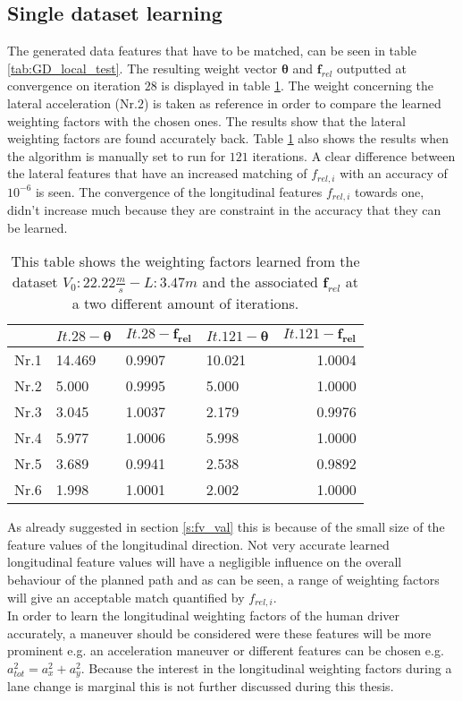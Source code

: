 \subsection{Single dataset learning}\label{s:SDL}
The generated data features that have to be matched, can be seen in table \ref{tab:GD_local_test}.
The resulting weight vector $\bm{\theta}$ and $\bm{f}_{rel}$ outputted at convergence on iteration $28$ is displayed in table \ref{tab:comp_it}. The weight concerning the lateral acceleration (Nr.$2$) is taken as reference in order to compare the learned weighting factors with the chosen ones. The results show that the lateral weighting factors are found accurately back. Table \ref{tab:comp_it} also shows the results when the algorithm is manually set to run for $121$ iterations.
A clear difference between the lateral features that have an increased matching of $f_{rel,i}$ with an accuracy of $10^{-6}$ is seen. The convergence of the longitudinal features $f_{rel,i}$ towards one, didn't increase much because they are constraint in the accuracy that they can be learned. 

\begin{table}[h!]
	\centering
	\begin{tabular}{@{}llllr@{}} \toprule
					      & $It.28-\bm{\theta}$ & $It.28-\bm{f_{rel}}$ & $It.121- \bm{\theta}$ & $It.121-\bm{f_{rel}}$\\ \midrule
		Nr.1       		  &14.469        & 0.9907 	    & 10.021 &	1.0004	\\
		Nr.2              &5.000       & 0.9995       & 5.000 &   1.0000   \\
		Nr.3              & 3.045       & 1.0037       & 2.179 &  0.9976    \\
		Nr.4              & 5.977       & 1.0006       & 5.998 & 1.0000     \\
		Nr.5              & 3.689       & 0.9941       & 2.538 &   0.9892   \\
		Nr.6              & 1.998       & 1.0001       & 2.002 &  1.0000    \\ \bottomrule
	\end{tabular}
	\caption{This table shows the weighting factors learned from the dataset $V_0:22.22\frac{m}{s}-L:3.47m$ and the associated $\bm{f}_{rel}$ at a two different amount of iterations.}
	\label{tab:comp_it}
\end{table} 

 As already suggested in section \ref{s:fv_val} this is because of the small size of the feature values of the longitudinal direction. Not very accurate learned longitudinal feature values will have a negligible influence on the overall behaviour of the planned path and as can be seen, a range of weighting factors will give an acceptable match quantified by $f_{rel,i}$.\\
 In order to learn the longitudinal weighting factors of the human driver accurately, a maneuver should be considered were these features will be more prominent e.g. an acceleration maneuver or different features can be chosen e.g. $a_{tot}^2 = a_x^2 + a_y^2$. Because the interest in the longitudinal weighting factors during a lane change is marginal this is not further discussed during this thesis.\\          

